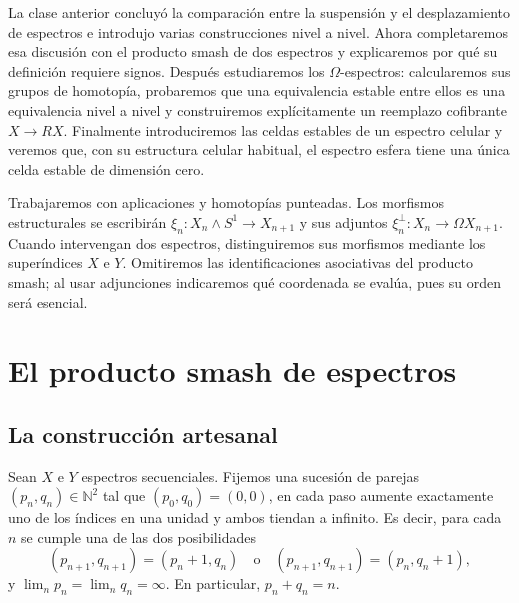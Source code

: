 La clase anterior concluyó la comparación entre la suspensión y el desplazamiento de espectros e introdujo varias construcciones nivel a nivel. Ahora completaremos esa discusión con el producto smash de dos espectros y explicaremos por qué su definición requiere signos. Después estudiaremos los $\Omega$-espectros: calcularemos sus grupos de homotopía, probaremos que una equivalencia estable entre ellos es una equivalencia nivel a nivel y construiremos explícitamente un reemplazo cofibrante $X\to RX$. Finalmente introduciremos las celdas estables de un espectro celular y veremos que, con su estructura celular habitual, el espectro esfera tiene una única celda estable de dimensión cero.

Trabajaremos con aplicaciones y homotopías punteadas. Los morfismos estructurales se escribirán $\xi_n\colon X_n\wedge S^1\to X_{n+1}$ y sus adjuntos $\xi_n^{\perp}\colon X_n\to\Omega X_{n+1}$. Cuando intervengan dos espectros, distinguiremos sus morfismos mediante los superíndices $X$ e $Y$. Omitiremos las identificaciones asociativas del producto smash; al usar adjunciones indicaremos qué coordenada se evalúa, pues su orden será esencial.

\section{El producto smash de espectros}

\subsection{La construcción artesanal}

Sean $X$ e $Y$ espectros secuenciales. Fijemos una sucesión de parejas $(p_n,q_n)\in\mathbb N^2$ tal que $(p_0,q_0)=(0,0)$, en cada paso aumente exactamente uno de los índices en una unidad y ambos tiendan a infinito. Es decir, para cada $n$ se cumple una de las dos posibilidades
\[
(p_{n+1},q_{n+1})=(p_n+1,q_n)
\quad\text{o}\quad
(p_{n+1},q_{n+1})=(p_n,q_n+1),
\]
y $\lim_n p_n=\lim_n q_n=\infty$. En particular, $p_n+q_n=n$.

